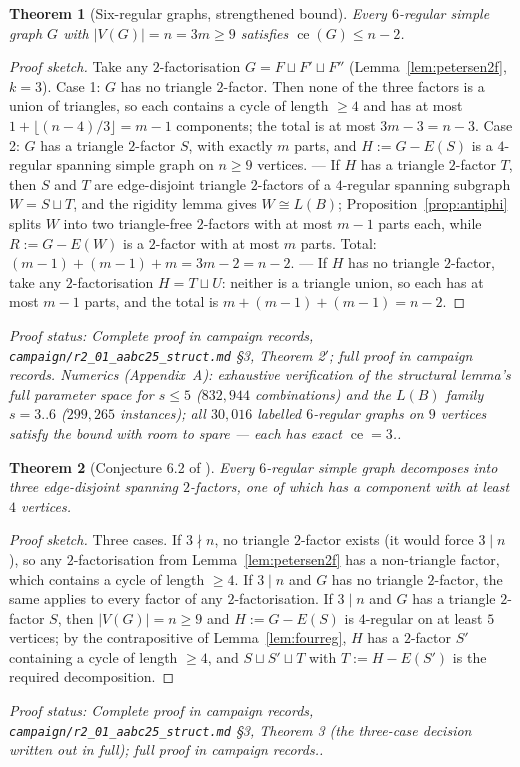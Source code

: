 \documentclass[a4paper,11pt]{amsart}
\newtheorem{theorem}{Theorem}[section]
\theoremstyle{definition}
\theoremstyle{remark}
\newcommand{\ce}{\operatorname{ce}}
\newcommand{\proofsrc}[1]{\par\smallskip\noindent\begin{sloppypar}\small\emph{Proof status: #1.}\end{sloppypar}\par\smallskip}
\begin{document}
\begin{theorem}[Six-regular graphs, strengthened bound]\label{thm:sixreg}
Every $6$-regular simple graph $G$ with $|V(G)|=n=3m\ge9$ satisfies $\ce(G)\le n-2$.
\end{theorem}
\begin{proof}[Proof sketch]
Take any $2$-factorisation $G=F\sqcup F'\sqcup F''$ (Lemma~\ref{lem:petersen2f}, $k=3$).
Case 1: $G$ has no triangle $2$-factor. Then none of the three factors is a union of triangles, so each
contains a cycle of length $\ge4$ and has at most $1+\lfloor(n-4)/3\rfloor=m-1$ components; the total is at
most $3m-3=n-3$.
Case 2: $G$ has a triangle $2$-factor $S$, with exactly $m$ parts, and $H:=G-E(S)$ is a $4$-regular
spanning simple graph on $n\ge9$ vertices.
--- If $H$ has a triangle $2$-factor $T$, then $S$ and $T$ are edge-disjoint triangle $2$-factors of a
$4$-regular spanning subgraph $W=S\sqcup T$, and the rigidity lemma gives $W\cong L(B)$;
Proposition~\ref{prop:antiphi} splits $W$ into two triangle-free $2$-factors with at most $m-1$ parts each,
while $R:=G-E(W)$ is a $2$-factor with at most $m$ parts. Total: $(m-1)+(m-1)+m=3m-2=n-2$.
--- If $H$ has no triangle $2$-factor, take any $2$-factorisation $H=T\sqcup U$: neither is a triangle
union, so each has at most $m-1$ parts, and the total is $m+(m-1)+(m-1)=n-2$.
\end{proof}
\proofsrc{Complete proof in campaign records, \texttt{campaign/r2\_01\_aabc25\_struct.md} \S3, Theorem
2$'$; full proof in campaign records. Numerics (Appendix~A): exhaustive verification of the structural
lemma's full parameter space for $s\le5$ ($832{,}944$ combinations) and the $L(B)$ family $s=3..6$
($299{,}265$ instances); all $30{,}016$ labelled $6$-regular graphs on $9$ vertices satisfy the bound with
room to spare --- each has exact $\ce=3$.}

\begin{theorem}[Conjecture 6.2 of \cite{AABC25}]\label{thm:sixregconj}
Every $6$-regular simple graph decomposes into three edge-disjoint spanning $2$-factors, one of which has
a component with at least $4$ vertices.
\end{theorem}
\begin{proof}[Proof sketch]
Three cases. If $3\nmid n$, no triangle $2$-factor exists (it would force $3\mid n$), so any
$2$-factorisation from Lemma~\ref{lem:petersen2f} has a non-triangle factor, which contains a cycle of
length $\ge4$. If $3\mid n$ and $G$ has no triangle $2$-factor, the same applies to every factor of any
$2$-factorisation. If $3\mid n$ and $G$ has a triangle $2$-factor $S$, then $|V(G)|=n\ge9$ and
$H:=G-E(S)$ is $4$-regular on at least $5$ vertices; by the contrapositive of
Lemma~\ref{lem:fourreg}, $H$ has a $2$-factor $S'$ containing a cycle of length $\ge4$, and
$S\sqcup S'\sqcup T$ with $T:=H-E(S')$ is the required decomposition.
\end{proof}
\proofsrc{Complete proof in campaign records, \texttt{campaign/r2\_01\_aabc25\_struct.md} \S3, Theorem 3
(the three-case decision written out in full); full proof in campaign records.}
\end{document}

